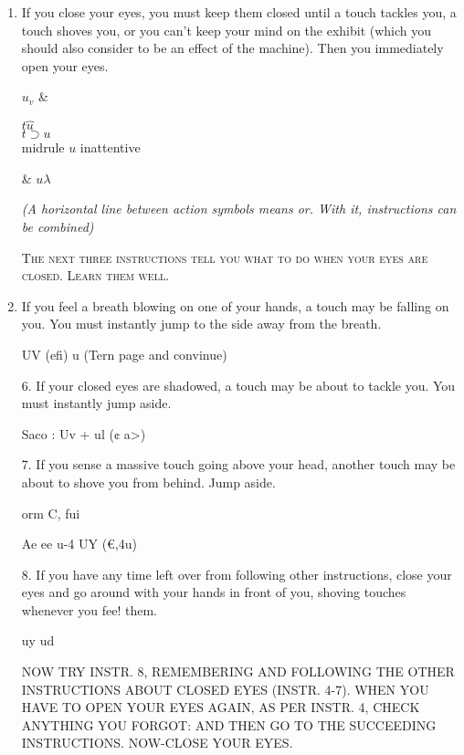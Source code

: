 \documentclass[10pt,twoside]{memoir}
\begin{document}
\begin{enumerate}
{\begin{enumerate}
\begin{sysrules}
\begin{sysrules}
\begin{sysrules}
\begin{sysrules}
{\begin{enumerate}
\begin{sysrules}
\begin{enumerate}
\textsc{If there are any sights, try standing around and following these instructions for a short while.}

\item If you close your eyes, you must keep them closed until a touch 
tackles you, a touch shoves you, or you can't keep your mind on the exhibit 
(which you should also consider to be an effect of the machine). Then you 
immediately open your eyes. 

		\begin{tabular}
			$u_v$ & \begin{tabular}
				$t\overbrace{u}$ \\ \midrule
				$t\supset u$ \\ midrule
				$u$ inattentive \\
			\end{tabular} & $u\lambda$ \\
		\end{tabular}

\emph{(A horizontal line between action symbols means \emph{or.} With it, instructions can be combined)}

\textsc{The next three instructions tell you what to do when your eyes are closed. Learn them well.}

\item If you feel a breath blowing on one of your hands, a touch may be 
falling on you. You must instantly jump to the side away from the breath. 


UV (efi) u (Tern page and convinue) 


6. If your closed eyes are shadowed, a touch may be about to tackle 
you. You must instantly jump aside. 


Saco : 
Uv + ul 
(¢ a>) 


7. If you sense a massive touch going above your head, another touch 
may be about to shove you from behind. Jump aside. 


orm 
C, fui 


Ae ee u-4 
UY (€,4u) 


8. If you have any time left over from following other instructions, 
close your eyes and go around with your hands in front of you, shoving 
touches whenever you fee! them. 


uy ud 


NOW TRY INSTR. 8, REMEMBERING AND FOLLOWING THE 
OTHER INSTRUCTIONS ABOUT CLOSED EYES (INSTR. 4-7). WHEN 
YOU HAVE TO OPEN YOUR EYES AGAIN, AS PER INSTR. 4, CHECK 
ANYTHING YOU FORGOT: AND THEN GO TO THE SUCCEEDING 
INSTRUCTIONS. NOW-CLOSE YOUR EYES. 


\end{enumerate}
\end{sysrules}
\end{enumerate}}
\end{sysrules}
\end{sysrules}
\end{sysrules}
\end{sysrules}
\end{enumerate}}
\end{enumerate}
\end{document}
